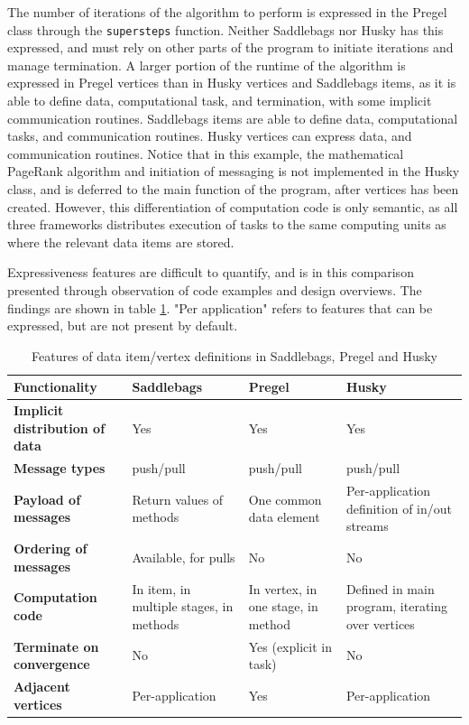 \documentclass{uit-report}
\begin{document}
The number of iterations of the algorithm to perform is expressed in the Pregel class through the \texttt{supersteps} function. Neither Saddlebags nor Husky has this expressed, and must rely on other parts of the program to initiate iterations and manage termination. A larger portion of the runtime of the algorithm is expressed in Pregel vertices than in Husky vertices and Saddlebags items, as it is able to define data, computational task, and termination, with some implicit communication routines. Saddlebags items are able to define data, computational tasks, and communication routines. Husky vertices can express data, and communication routines. Notice that in this example, the mathematical PageRank algorithm and initiation of messaging is not implemented in the Husky class, and is deferred to the main function of the program, after vertices has been created. However, this differentiation of computation code is only semantic, as all three frameworks distributes execution of tasks to the same computing units as where the relevant data items are stored.

Expressiveness features are difficult to quantify, and is in this comparison presented through observation of code examples and design overviews. The findings are shown in table \ref{table:programmability}. "Per application" refers to features that can be expressed, but are not present by default.


\begin{table}[b!]
	\begin{center}

	\setlength\arrayrulewidth{1pt}
	\renewcommand{\arraystretch}{2}
	\begin{tabular}{ | p{4cm} | p{3.5cm} | p{3.5cm} | p{3.5cm} |}
		\hline
		\textbf{Functionality} & \textbf{Saddlebags} & \textbf{Pregel} & \textbf{Husky}\\ \hline
		\textbf{Implicit distribution of data} & Yes & Yes & Yes \\ \hline
		\textbf{Message types} & push/pull & push/pull & push/pull \\ \hline
		\textbf{Payload of messages} &Return values of methods  & One common data element & Per-application definition of in/out streams\\ \hline
		\textbf{Ordering of messages} & Available, for pulls & No & No \\ \hline
		\textbf{Computation code} & In item, in multiple stages, in methods & In vertex, in one stage, in method & Defined in main program, iterating over vertices \\ \hline
		\textbf{Terminate on convergence} & No & Yes (explicit in task) & No \\ \hline
		\textbf{Adjacent vertices} & Per-application & Yes & Per-application \\ \hline
	\end{tabular}
	\caption{Features of data item/vertex definitions in Saddlebags, Pregel and Husky}
	\label{table:programmability}

	\end{center}
\end{table}
\end{document}

